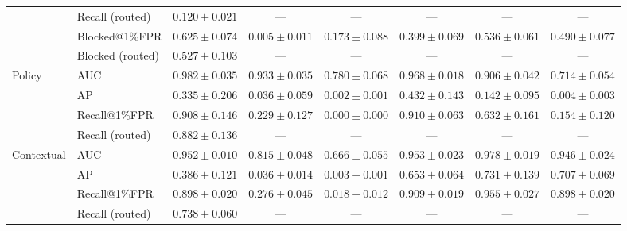 \begin{table}[t]
{\begin{tabular}{llcccccc}
 & Recall (routed) & $0.120\pm0.021$ & --- & --- & --- & --- & --- \\
 & Blocked@1\%FPR & $0.625\pm0.074$ & $0.005\pm0.011$ & $0.173\pm0.088$ & $0.399\pm0.069$ & $0.536\pm0.061$ & $0.490\pm0.077$ \\
 & Blocked (routed) & $0.527\pm0.103$ & --- & --- & --- & --- & --- \\
\midrule
\multirow{4}{*}{Policy} & AUC & $0.982\pm0.035$ & $0.933\pm0.035$ & $0.780\pm0.068$ & $0.968\pm0.018$ & $0.906\pm0.042$ & $0.714\pm0.054$ \\
 & AP & $0.335\pm0.206$ & $0.036\pm0.059$ & $0.002\pm0.001$ & $0.432\pm0.143$ & $0.142\pm0.095$ & $0.004\pm0.003$ \\
 & Recall@1\%FPR & $0.908\pm0.146$ & $0.229\pm0.127$ & $0.000\pm0.000$ & $0.910\pm0.063$ & $0.632\pm0.161$ & $0.154\pm0.120$ \\
 & Recall (routed) & $0.882\pm0.136$ & --- & --- & --- & --- & --- \\
\midrule
\multirow{4}{*}{Contextual} & AUC & $0.952\pm0.010$ & $0.815\pm0.048$ & $0.666\pm0.055$ & $0.953\pm0.023$ & $0.978\pm0.019$ & $0.946\pm0.024$ \\
 & AP & $0.386\pm0.121$ & $0.036\pm0.014$ & $0.003\pm0.001$ & $0.653\pm0.064$ & $0.731\pm0.139$ & $0.707\pm0.069$ \\
 & Recall@1\%FPR & $0.898\pm0.020$ & $0.276\pm0.045$ & $0.018\pm0.012$ & $0.909\pm0.019$ & $0.955\pm0.027$ & $0.898\pm0.020$ \\
 & Recall (routed) & $0.738\pm0.060$ & --- & --- & --- & --- & --- \\
\bottomrule
\end{tabular}}
\end{table}
